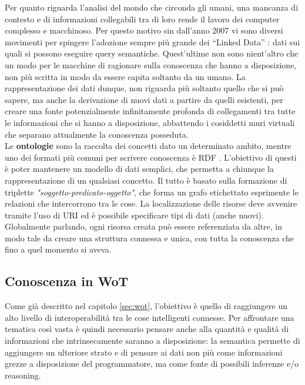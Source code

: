 \documentclass[12pt,a4paper,openright,oneside]{report}
\newcommand{\quotes}[1]{``#1''}
\begin{document}
Per quanto riguarda l'analisi del mondo che circonda gli umani, una mancanza di contesto e di informazioni collegabili tra di loro rende il lavoro dei computer complesso e macchinoso. Per questo motivo sin dall'anno 2007 vi sono diversi movimenti per spingere l'adozione sempre più grande dei \quotes{Linked Data} \cite{linkeddata}: dati sui quali si possono eseguire query semantiche. Quest'ultime non sono nient'altro che un modo per le macchine di ragionare sulla conoscenza che hanno a disposizione, non più scritta in modo da essere capita soltanto da un umano. La rappresentazione dei dati dunque, non riguarda più soltanto quello che si può sapere, ma anche la derivazione di nuovi dati a partire da quelli esistenti, per creare una fonte potenzialmente infinitamente profonda di collegamenti tra tutte le informazioni che si hanno a disposizione, abbattendo i cosiddetti muri virtuali che separano attualmente la conoscenza posseduta.\\

Le \textbf{ontologie} \cite{ontology} sono la raccolta dei concetti dato un determinato ambito, mentre uno dei formati più comuni per scrivere conoscenza è RDF \cite{rdf}. L'obiettivo di questi è poter mantenere un modello di dati semplici, che permetta a chiunque la rappresentazione di un qualsiasi concetto. Il tutto è basato sulla formazione di triplette \textit{"soggetto-predicato-oggetto"}, che forma un grafo etichettato esprimente le relazioni che intercorrono tra le cose. La localizzazione delle risorse deve avvenire tramite l'uso di URI ed è possibile specificare tipi di dati (anche nuovi). Globalmente parlando, ogni risorsa creata può essere referenziata da altre, in modo tale da creare una struttura connessa e unica, con tutta la conoscenza che fino a quel momento si aveva.

\subsection{Conoscenza in WoT}
\label{knowledge-wot}
Come già descritto nel capitolo \ref{sec:wot}, l'obiettivo è quello di raggiungere un alto livello di interoperabilità tra le cose intelligenti connesse. Per affrontare una tematica così vasta è quindi necessario pensare anche alla quantità e qualità di informazioni che intrinsecamente saranno a disposizione: la semantica permette di aggiungere un ulteriore strato e di pensare ai dati non più come informazioni grezze a disposizione del programmatore, ma come fonte di possibili inferenze e/o reasoning.\\
\end{document}
